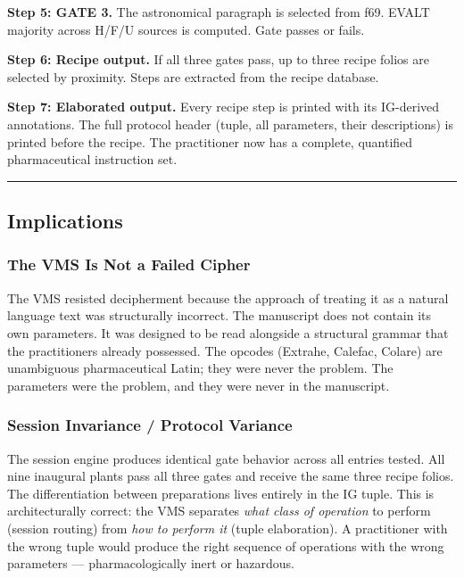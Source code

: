 \textbf{Step 5: GATE 3.} The astronomical paragraph is selected from
f69. EVALT majority across H/F/U sources is computed. Gate passes or
fails.

\textbf{Step 6: Recipe output.} If all three gates pass, up to three
recipe folios are selected by proximity. Steps are extracted from the
recipe database.

\textbf{Step 7: Elaborated output.} Every recipe step is printed with
its IG-derived annotations. The full protocol header (tuple, all
parameters, their descriptions) is printed before the recipe. The
practitioner now has a complete, quantified pharmaceutical instruction
set.

\begin{center}\rule{0.5\linewidth}{0.5pt}\end{center}

\hypertarget{implications}{%
\subsection{Implications}\label{implications}}

\hypertarget{the-vms-is-not-a-failed-cipher}{%
\subsubsection{The VMS Is Not a Failed
Cipher}\label{the-vms-is-not-a-failed-cipher}}

The VMS resisted decipherment because the approach of treating it as a
natural language text was structurally incorrect. The manuscript does
not contain its own parameters. It was designed to be read alongside a
structural grammar that the practitioners already possessed. The opcodes
(Extrahe, Calefac, Colare) are unambiguous pharmaceutical Latin; they
were never the problem. The parameters were the problem, and they were
never in the manuscript.

\hypertarget{session-invariance-protocol-variance}{%
\subsubsection{Session Invariance / Protocol
Variance}\label{session-invariance-protocol-variance}}

The session engine produces identical gate behavior across all entries
tested. All nine inaugural plants pass all three gates and receive the
same three recipe folios. The differentiation between preparations lives
entirely in the IG tuple. This is architecturally correct: the VMS
separates \emph{what class of operation} to perform (session routing)
from \emph{how to perform it} (tuple elaboration). A practitioner with
the wrong tuple would produce the right sequence of operations with the
wrong parameters --- pharmacologically inert or hazardous.

